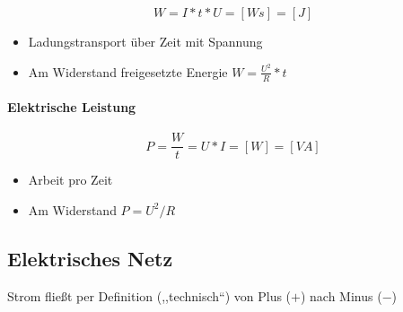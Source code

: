 $$W = I * t * U = [Ws] = [J]$$

\begin{itemize}
  \item Ladungstransport über Zeit mit Spannung
  \item Am Widerstand freigesetzte Energie $W = \frac{U^2}{R} * t$
\end{itemize}

\paragraph{Elektrische Leistung}

$$P = \frac{W}{t} = U * I = [W] = [VA]$$

\begin{itemize}
  \item Arbeit pro Zeit
  \item Am Widerstand $P = U^2 / R$
\end{itemize}

\subsection{Elektrisches Netz}


Strom flie\ss t per Definition (,,technisch``) von Plus ($+$) nach Minus ($-$)

